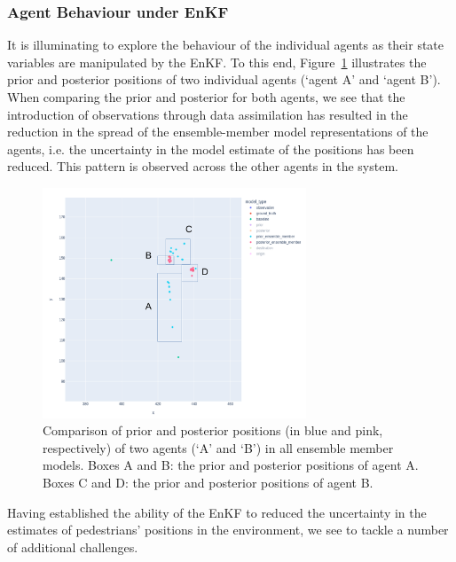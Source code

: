 \documentclass{article}
\begin{document}

\subsubsection*{Agent Behaviour under EnKF}

It is illuminating to explore the behaviour of the individual agents as their state variables are manipulated by the EnKF. To this end, Figure~\ref{fig:gcs_updating} illustrates the prior and posterior positions of two individual agents (`agent A' and `agent B').
When comparing the prior and posterior for both agents, we see that the
introduction of observations through data assimilation has resulted in the
reduction in the spread of the ensemble-member model representations of the
agents, i.e. the uncertainty in the model estimate of the positions has been reduced.
This pattern is observed across the other agents in the system.

\begin{figure}[htb]
	\centering
	\includegraphics[width=0.7\textwidth]{figures/updating_state.pdf}
	\caption{Comparison of prior and posterior positions (in blue and pink, respectively) of two agents (`A' and `B') in all ensemble member models. 
		Boxes A and B: the prior and posterior positions of agent A.
		Boxes C and D: the prior and posterior positions of agent B.}\label{fig:gcs_updating}
\end{figure}

Having established the ability of the EnKF to reduced the uncertainty in the estimates of pedestrians' positions in the environment, we see to tackle a number of additional challenges.
\end{document}
